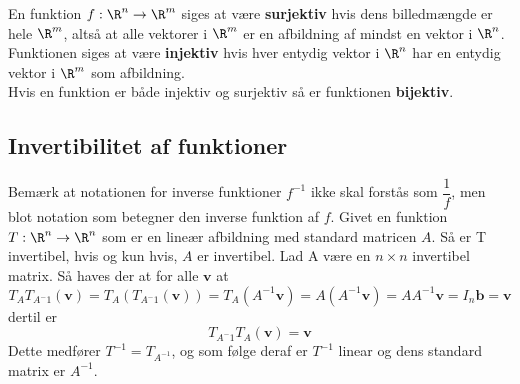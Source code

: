 
\begin{defn}{}{}
En funktion $f:\R^n \rightarrow \R^m$ siges at være \textbf{surjektiv} hvis dens billedmængde er hele $\R^m$, altså at alle vektorer i $\R^m$ er en afbildning af mindst en vektor i $\R^n$.\\
Funktionen siges at være \textbf{injektiv} hvis hver entydig vektor i $\R^n$ har en entydig vektor i $\R^m$ som afbildning.\\
Hvis en funktion er både injektiv og surjektiv så er funktionen \textbf{bijektiv}.
\end{defn}
\subsection{Invertibilitet af funktioner}

Bemærk at notationen for inverse funktioner $f^{-1}$ ikke skal forstås som $\dfrac{1}{f}$, men blot notation som betegner den inverse funktion af $f$.
Givet en funktion $T:\R^n \rightarrow \R^n$ som er en lineær afbildning med standard matricen $A$.
Så er T invertibel, hvis og kun hvis, $A$ er invertibel. Lad A være en $n \times n$ invertibel matrix. 
Så haves der at for alle $\textbf{v}$ at
$$T_AT_{A^-1}(\textbf{v})=T_A(T_{A^-1}(\textbf{v}))=T_A(A^{-1}\textbf{v})=A(A^{-1}\textbf{v})=AA^{-1}\textbf{v}=I_n\textbf{b}=\textbf{v}$$ dertil er
$$T_{A^-1}T_A(\textbf{v})=\textbf{v}$$
\noindent
Dette medfører $T^{-1}=T_{A^{-1}}$, og som følge deraf er $T^{-1}$ linear og dens standard matrix er $A^{-1}$.





